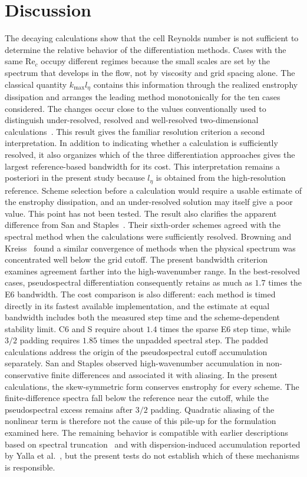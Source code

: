 \documentclass[11pt,a4paper]{article}
\newcommand{\Rey}{\mathrm{Re}}
\begin{document}
\section{Discussion}
The decaying calculations show that the cell Reynolds number is not sufficient to determine the relative behavior of the differentiation methods. Cases with the same $\Rey_c$ occupy different regimes because the small scales are set by the spectrum that develops in the flow, not by viscosity and grid spacing alone. The classical quantity $k_{\max}l_\eta$ contains this information through the realized enstrophy dissipation and arranges the leading method monotonically for the ten cases considered. The changes occur close to the values conventionally used to distinguish under-resolved, resolved and well-resolved two-dimensional calculations~\cite{lunasin2007}.
This result gives the familiar resolution criterion a second interpretation. In addition to indicating whether a calculation is sufficiently resolved, it also organizes which of the three differentiation approaches gives the largest reference-based bandwidth for its cost. This interpretation remains a posteriori in the present study because $l_\eta$ is obtained from the high-resolution reference. Scheme selection before a calculation would require a usable estimate of the enstrophy dissipation, and an under-resolved solution may itself give a poor value. This point has not been tested.
The result also clarifies the apparent difference from San and Staples~\cite{san2012}. Their sixth-order schemes agreed with the spectral method when the calculations were sufficiently resolved. Browning and Kreiss~\cite{browning1989} found a similar convergence of methods when the physical spectrum was concentrated well below the grid cutoff. The present bandwidth criterion examines agreement farther into the high-wavenumber range. In the best-resolved cases, pseudospectral differentiation consequently retains as much as $1.7$ times the E6 bandwidth. The cost comparison is also different: each method is timed directly in its fastest available implementation, and the estimate at equal bandwidth includes both the measured step time and the scheme-dependent stability limit. C6 and S require about $1.4$ times the sparse E6 step time, while $3/2$ padding requires $1.85$ times the unpadded spectral step.
The padded calculations address the origin of the pseudospectral cutoff accumulation separately. San and Staples observed high-wavenumber accumulation in non-conservative finite differences and associated it with aliasing. In the present calculations, the skew-symmetric form conserves enstrophy for every scheme. The finite-difference spectra fall below the reference near the cutoff, while the pseudospectral excess remains after $3/2$ padding. Quadratic aliasing of the nonlinear term is therefore not the cause of this pile-up for the formulation examined here. The remaining behavior is compatible with earlier descriptions based on spectral truncation~\cite{ishihara2018,bardos2015,frisch2008} and with dispersion-induced accumulation reported by Yalla et al.~\cite{yalla2021}, but the present tests do not establish which of these mechanisms is responsible.
\end{document}

